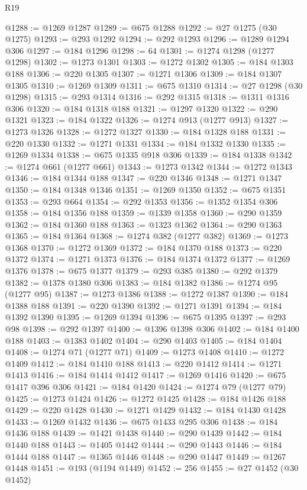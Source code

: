 \begin{lexlean}{R19}
\begin{coremodule}
@1288 := @1269 @1287
@1289 := @675 @1288
@1292 := @27 @1275 (@30 @1275)
@1293 := @293 @1292
@1294 := @292 @1293
@1296 := @1289 @1294 @306
@1297 := @184 @1296
@1298 := 64
@1301 := @1274 @1298 (@1277 @1298)
@1302 := @1273 @1301
@1303 := @1272 @1302
@1305 := @184 @1303 @188
@1306 := @220 @1305
@1307 := @1271 @1306
@1309 := @184 @1307 @1305
@1310 := @1269 @1309
@1311 := @675 @1310
@1314 := @27 @1298 (@30 @1298)
@1315 := @293 @1314
@1316 := @292 @1315
@1318 := @1311 @1316 @306
@1320 := @184 @1318 @188
@1321 := @1297 @1320
@1322 := @290 @1321
@1323 := @184 @1322
@1326 := @1274 @913 (@1277 @913)
@1327 := @1273 @1326
@1328 := @1272 @1327
@1330 := @184 @1328 @188
@1331 := @220 @1330
@1332 := @1271 @1331
@1334 := @184 @1332 @1330
@1335 := @1269 @1334
@1338 := @675 @1335 @918 @306
@1339 := @184 @1338
@1342 := @1274 @661 (@1277 @661)
@1343 := @1273 @1342
@1344 := @1272 @1343
@1346 := @184 @1344 @188
@1347 := @220 @1346
@1348 := @1271 @1347
@1350 := @184 @1348 @1346
@1351 := @1269 @1350
@1352 := @675 @1351
@1353 := @293 @664
@1354 := @292 @1353
@1356 := @1352 @1354 @306
@1358 := @184 @1356 @188
@1359 := @1339 @1358
@1360 := @290 @1359
@1362 := @184 @1360 @188
@1363 := @1323 @1362
@1364 := @290 @1363
@1365 := @184 @1364
@1368 := @1274 @382 (@1277 @382)
@1369 := @1273 @1368
@1370 := @1272 @1369
@1372 := @184 @1370 @188
@1373 := @220 @1372
@1374 := @1271 @1373
@1376 := @184 @1374 @1372
@1377 := @1269 @1376
@1378 := @675 @1377
@1379 := @293 @385
@1380 := @292 @1379
@1382 := @1378 @1380 @306
@1383 := @184 @1382
@1386 := @1274 @95 (@1277 @95)
@1387 := @1273 @1386
@1388 := @1272 @1387
@1390 := @184 @1388 @188
@1391 := @220 @1390
@1392 := @1271 @1391
@1394 := @184 @1392 @1390
@1395 := @1269 @1394
@1396 := @675 @1395
@1397 := @293 @98
@1398 := @292 @1397
@1400 := @1396 @1398 @306
@1402 := @184 @1400 @188
@1403 := @1383 @1402
@1404 := @290 @1403
@1405 := @184 @1404
@1408 := @1274 @71 (@1277 @71)
@1409 := @1273 @1408
@1410 := @1272 @1409
@1412 := @184 @1410 @188
@1413 := @220 @1412
@1414 := @1271 @1413
@1416 := @184 @1414 @1412
@1417 := @1269 @1416
@1420 := @675 @1417 @396 @306
@1421 := @184 @1420
@1424 := @1274 @79 (@1277 @79)
@1425 := @1273 @1424
@1426 := @1272 @1425
@1428 := @184 @1426 @188
@1429 := @220 @1428
@1430 := @1271 @1429
@1432 := @184 @1430 @1428
@1433 := @1269 @1432
@1436 := @675 @1433 @295 @306
@1438 := @184 @1436 @188
@1439 := @1421 @1438
@1440 := @290 @1439
@1442 := @184 @1440 @188
@1443 := @1405 @1442
@1444 := @290 @1443
@1446 := @184 @1444 @188
@1447 := @1365 @1446
@1448 := @290 @1447
@1449 := @1267 @1448
@1451 := @193 (@1194 @1449)
@1452 := 256
@1455 := @27 @1452 (@30 @1452)

\end{coremodule}
\end{lexlean}
